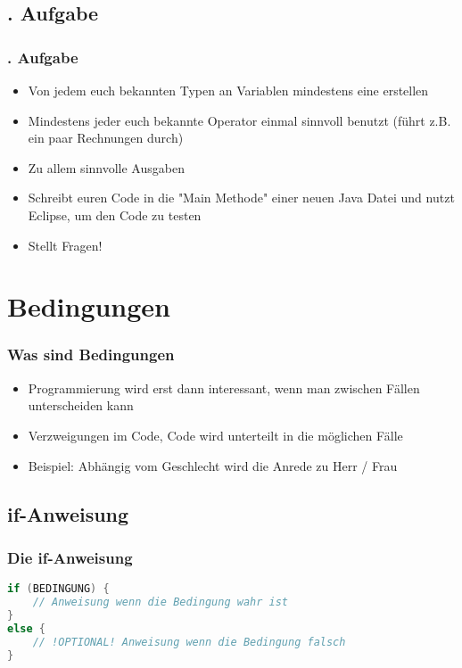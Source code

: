 \documentclass{beamer}
\begin{document}
\subsection{. Aufgabe}

\begin{frame}[fragile]
	\frametitle{. Aufgabe}
	\begin{itemize}
		\item Von jedem euch bekannten Typen an Variablen mindestens eine erstellen
		\item Mindestens jeder euch bekannte Operator einmal sinnvoll benutzt (führt z.B. ein paar Rechnungen durch)
		\item Zu allem sinnvolle Ausgaben
		\item Schreibt euren Code in die "Main Methode" einer neuen Java Datei und nutzt Eclipse, um den Code zu testen
		\item Stellt Fragen!
	\end{itemize}
\end{frame}

\section{Bedingungen}
\begin{frame}[fragile]
	\frametitle{Was sind Bedingungen}
	\begin{itemize}
		\item Programmierung wird erst dann interessant, wenn man zwischen Fällen unterscheiden kann
		\item Verzweigungen im Code, Code wird unterteilt in die möglichen Fälle
		\item Beispiel: Abhängig vom Geschlecht wird die Anrede zu Herr / Frau
	\end{itemize}
\end{frame}


\begin{frame}[fragile]
\subsection{if-Anweisung}
\frametitle{Die if-Anweisung}
\begin{lstlisting}[language=java]
if (BEDINGUNG) {
	// Anweisung wenn die Bedingung wahr ist	
}
else {
	// !OPTIONAL! Anweisung wenn die Bedingung falsch
}
	\end{lstlisting}
\end{frame}
\end{document}
